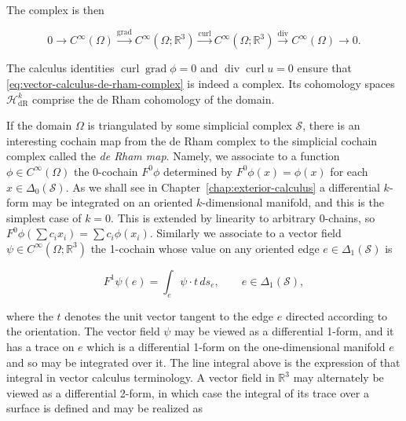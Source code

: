 {The complex is then}

\begin{equation}\label{eq:vector-calculus-de-rham-complex}
0\to C^\infty(\Omega)\xrightarrow{\operatorname{grad}}C^\infty(\Omega;\mathbb R^3)\xrightarrow{\operatorname{curl}}C^\infty(\Omega;\mathbb R^3)\xrightarrow{\operatorname{div}}C^\infty(\Omega)\to0.
\end{equation}

{The calculus identities $\operatorname{curl}\operatorname{grad}\phi=0$ and $\operatorname{div}\operatorname{curl}u=0$ ensure that \eqref{eq:vector-calculus-de-rham-complex} is indeed a complex. Its cohomology spaces $\mathcal H^k_{\mathrm{dR}}$ comprise the de Rham cohomology of the domain.}

{If the domain $\Omega$ is triangulated by some simplicial complex $\mathcal S$, there is an interesting cochain map from the de Rham complex to the simplicial cochain complex called the \emph{de Rham map}. Namely, we associate to a function $\phi\in C^\infty(\Omega)$ the 0-cochain $F^0\phi$ determined by $F^0\phi(x)=\phi(x)$ for each $x\in\Delta_0(\mathcal S)$. As we shall see in Chapter~\ref{chap:exterior-calculus} a differential $k$-form may be integrated on an oriented $k$-dimensional manifold, and this is the simplest case of $k=0$. This is extended by linearity to arbitrary 0-chains, so $F^0\phi(\sum c_ix_i)=\sum c_i\phi(x_i)$. Similarly we associate to a vector field $\psi\in C^\infty(\Omega;\mathbb R^3)$ the 1-cochain whose value on any oriented edge $e\in\Delta_1(\mathcal S)$ is}

\[
F^1\psi(e)=\int_e\psi\cdot t\,ds_e,\qquad e\in\Delta_1(\mathcal S),
\]

{where the $t$ denotes the unit vector tangent to the edge $e$ directed according to the orientation. The vector field $\psi$ may be viewed as a differential 1-form, and it has a trace on $e$ which is a differential 1-form on the one-dimensional manifold $e$ and so may be integrated over it. The line integral above is the expression of that integral in vector calculus terminology. A vector field in $\mathbb R^3$ may alternately be viewed as a differential 2-form, in which case the integral of its trace over a surface is defined and may be realized as}

